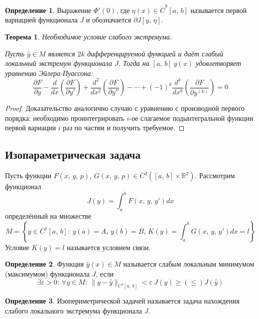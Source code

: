 \documentclass[a4paper,12pt]{article}
\renewcommand{\leq}{\ensuremath{\leqslant}}
\renewcommand{\geq}{\ensuremath{\geqslant}}
\theoremstyle{plain}
\newtheorem{theorem}{Теорема}[section]
\theoremstyle{definition}
\newtheorem{definition}{Определение}[section]
\theoremstyle{remark}
\begin{document}
\begin{definition}
	Выражение $\Phi'(0)$, где $\eta(x) \in \dot{C}^k[a,\,b]$ называется первой вариацией функционала $J$ и обозначается $\partial J[y,\,\eta]$.
\end{definition}

\begin{theorem}
	Необходимое условие слабого экстремума.

	Пусть $\hat{y} \in M$ является $2k$ дифференцируемой функцией и даёт слабый локальный экстремум функционала $J$. Тогда на $[a,\,b] \: \hat{y}(x)$ удовлетворяет уравнению Эйлера-Пуассона:
	\[\frac{\partial F}{\partial y} - \frac{d}{dx}\left(\frac{\partial F}{\partial y'}\right) + \frac{d^2}{dx^2}\left(\frac{\partial F}{\partial y''}\right) - \cdots + (-1)^k\frac{d^k}{dx^k}\left(\frac{\partial F}{\partial y^{(k)}}\right) = 0\]
\end{theorem}

\begin{proof}
	Доказательство аналогично случаю с уравнению с производной первого порядка: необходимо проинтегрировать $i$-ое слагаемое подынтегральной функции первой вариации $i$ раз по частям и получить требуемое.
\end{proof}

\subsection{Изопараметрическая задача}
Пусть функции $F(x,\,y,\,p),\, G(x,\, y,\, p) \in C^2([a,\,b] \times \mathbb{R}^2)$. Рассмотрим функционал
\[J(y) = \int_a^b F(x,\,y,\,y')dx\]
определённый на множестве
\[M = \left\{y \in C^1[a,\,b]:\: y(a) = A,\, y(b) = B,\, K(y) = \int_a^b G(x,\,y,\,y')dx = l\right\}\]
Условие $K(y) = l$ называется условием связи.

\begin{definition}
	Функция $\hat{y}(x) \in M$ называется слабым локальным минимумом (максимумом) функционала $J$, если
	\[\exists \varepsilon > 0:\: \forall y \in M:\: \|y - \hat{y}\|_{C^1[a,\,b]} < \varepsilon \: J(y) \geq(\leq) J(\hat{y})\]
\end{definition}

\begin{definition}
	Изопериметрической задачей называется задача нахождения слабого локального экстремума функционала $J$.
\end{definition}
\end{document}
